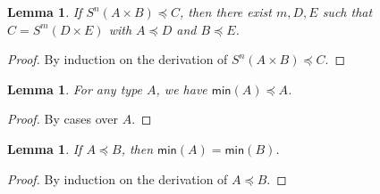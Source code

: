 \documentclass[preprint]{elsarticle}
\newtheorem{lemma}[theorem]{Lemma}
\begin{document}
\begin{lemma}\label{lem:SAxBmE}
  If $S^n(A\times B)\preceq C$, then there exist $m,D,E$ such that
  $C=S^m(D\times E)$ with $A\preceq D$ and $B\preceq E$.
\end{lemma}
\begin{proof}
  By induction on the derivation of $S^n(A\times B)\preceq C$.
\end{proof}
\begin{lemma}\label{lem:minlqA}
          For any type $A$, we have $\mathsf{min}(A)\preceq A$.
        \end{lemma}
        \begin{proof}
          By cases over $A$.
        \end{proof}
        \begin{lemma}\label{lem:minS}
          If $A\preceq B$, then $\mathsf{min}(A)=\mathsf{min}(B)$.
        \end{lemma}
        \begin{proof}
          By induction on the derivation of $A\preceq B$.
        \end{proof}
\end{document}
